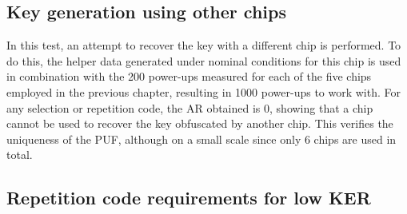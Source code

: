 \begin{table}[H]
  \caption{BER and AR value for the different selections when performing 200 power-ups 8 days after accelerated aging using two different repetition codes.}
  \label{tab:AR_aging}%
\end{table}%

\subsection{Key generation using other chips}

In this test, an attempt to recover the key with a different chip is performed. To do this, the helper data generated under nominal conditions for this chip is used in combination with the 200 power-ups measured for each of the five chips employed in the previous chapter, resulting in 1000 power-ups to work with. For any selection or repetition code, the AR obtained is 0, showing that a chip cannot be used to recover the key obfuscated by another chip. This verifies the uniqueness of the PUF, although on a small scale since only 6 chips are used in total.


\subsection{Repetition code requirements for low KER}

